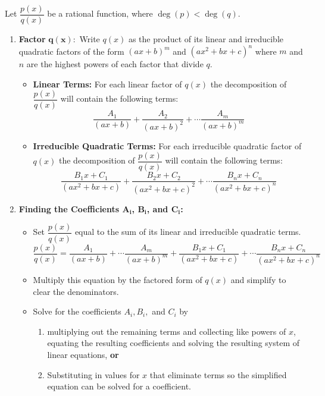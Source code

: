 \setboxwidth{50pt}
{Let $\dfrac{p(x)}{q(x)}$ be a rational function, where $\deg(p)<\deg(q)$.
\begin{enumerate}
	\item \textbf {Factor} $\mathbf{q(x):}$ Write $q(x)$ as the product of its linear and irreducible quadratic factors of the form $(ax+b)^m$ and $(ax^2+bx+c)^n$ where $m$ and $n$ are the highest powers of each factor that divide $q$.
	\begin{itemize}
		\item \textbf{Linear Terms:} For each linear factor of $q(x)$ the decomposition of $\dfrac{p(x)}{q(x)}$ will contain the following terms:
		\[\frac{A_1}{(ax+b)}+\frac {A_2}{(ax+b)^2}+\dotsb\frac{A_m}{(ax+b)^m}\]
		\item \textbf{Irreducible Quadratic Terms:}  For each irreducible quadratic factor of $q(x)$ the decomposition of $\dfrac {p(x)}{q(x)}$ will contain the following terms:
		\[
		 \dfrac{B_1x+C_1}{(ax^2+bx+c)}+\frac{B_2x+C_2}{(ax^2+bx+c)^2}
		 +\dotsb\frac{B_nx+C_n}{(ax^2+bx+c)^n}
		\]
	\end{itemize}
	\item \textbf{Finding the Coefficients $\mathbf{A_i}$, $\mathbf{B_i}$, and $\mathbf{C_i}$:}
	\begin{itemize}
		\item Set $\dfrac{p(x)}{q(x)}$ equal to the sum of its linear and irreducible quadratic terms.
		\[
		 \frac{p(x)}{q(x)}
		 =\frac{A_1}{(ax+b)}+\dotsb\frac{A_m}{(ax+b)^m}
		 +\frac{B_1x+C_1}{(ax^2+bx+c)}+\dotsb\frac{B_nx+C_n}{(ax^2+bx+c)^n}
		\]
		\item Multiply this equation by the factored form of $q(x)$ and simplify to clear the denominators. 
		\item Solve for the coefficients $A_i, B_i,$ and $C_i$ by
		\begin{enumerate}[label=(\alph*)]
			\item multiplying out the remaining terms and collecting like powers of $x$, equating the resulting coefficients and solving the resulting system of linear equations, \textbf{or}
			\item Substituting in values for $x$ that eliminate terms so the simplified equation can be solved for a coefficient.
		\end{enumerate}
	\end{itemize}
\end{enumerate}}


